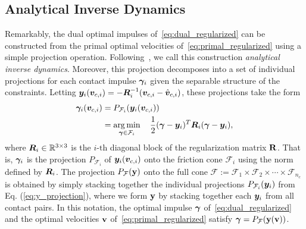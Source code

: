 \subsection{Analytical Inverse Dynamics}
\label{sec:analytical_inverse_dynamics}

Remarkably,  the dual optimal impulses of~\eqref{eq:dual_regularized} can be
constructed from the primal optimal velocities of~\eqref{eq:primal_regularized}
using a simple projection operation. Following~\cite{bib:todorov2014}, we call
this construction  \textit{analytical inverse dynamics}. Moreover, this
projection decomposes into a set of individual projections for each contact
impulse ${\bm\gamma}_i$ given the separable structure of the constraints. Letting
${\bm{y}}_i({\bm{v}}_{c,i}) = -{\bm{R}}_i^{-1}({\bm{v}}_{c,i}-\hat{{\bm{v}}}_{c,i})$,
these projections take the form
\begin{equation}
  \begin{aligned}
	\bgamma_i(\vf{v}_{c,i})&= P_{\mathcal{F}_i}(\vf{y}_i(\vf{v}_{c,i}))\\
	&= \argmin_{\bgamma\in\mathcal{F}_i} \quad 
		\frac{1}{2}(\bgamma-\vf{y}_i)^T\vf{R}_i(\bgamma-\vf{y}_i),\\
	\end{aligned}
	\label{eq:y_projection}
\end{equation}
where ${\bm{R}}_i\in\mathbb{R}^{3\times3}$ is the $i\text{-th}$ diagonal block of
the regularization matrix ${\mathbf{R}}$. That is, ${\bm\gamma}_i$ is the projection
$P_{\mathcal{F}_i}$ of ${\bm{y}}_i({\bm{v}}_{c,i})$ onto the friction cone
$\mathcal{F}_i$ using the norm defined by ${\bm{R}}_i$. The projection
$P_{\mathcal{F}}({\mathbf{y}})$ onto the full cone $\mathcal{F} := \mathcal{F}_1
\times \mathcal{F}_2 \times \cdots \times \mathcal{F}_{n_c}$ is obtained by simply
stacking together the individual projections $P_{\mathcal{F}_i}({\bm{y}}_i)$ from
Eq. (\ref{eq:y_projection}), where we form ${\mathbf{y}}$ by stacking together each
${\bm{y}}_i$ from all contact pairs.  In this notation, the optimal impulse
${\bm\gamma}$ of~\eqref{eq:dual_regularized} and the optimal velocities ${\mathbf{v}}$
of~\eqref{eq:primal_regularized} satisfy  ${\bm\gamma} =
P_{\mathcal{F}}({\mathbf{y}}({\mathbf{v}}))$.
